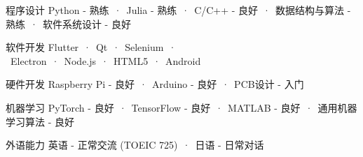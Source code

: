 

\begin{cvskills}
  \cvskill
    {程序设计} %
    {Python - 熟练\ ·\ Julia - 熟练\ ·\ C/C++ - 良好\ ·\ 数据结构与算法 - 熟练\ ·\ 软件系统设计 - 良好} %
    
  \cvskill
    {软件开发} %
    {Flutter\ ·\ Qt\ ·\ Selenium\ · \ Electron\ ·\ Node.js\ ·\ HTML5\ ·\ Android} %

  \cvskill
    {硬件开发} %
    {Raspberry Pi - 良好\ ·\ Arduino - 良好\ ·\ PCB设计 - 入门} %

  \cvskill
    {机器学习} %
    {PyTorch - 良好\ ·\ TensorFlow - 良好\ ·\ MATLAB - 良好\ ·\ 通用机器学习算法 - 良好} %

    
  \cvskill
    {外语能力} %
    {英语 - 正常交流 (TOEIC 725)\ ·\ 日语 - 日常对话} %
    

\end{cvskills}